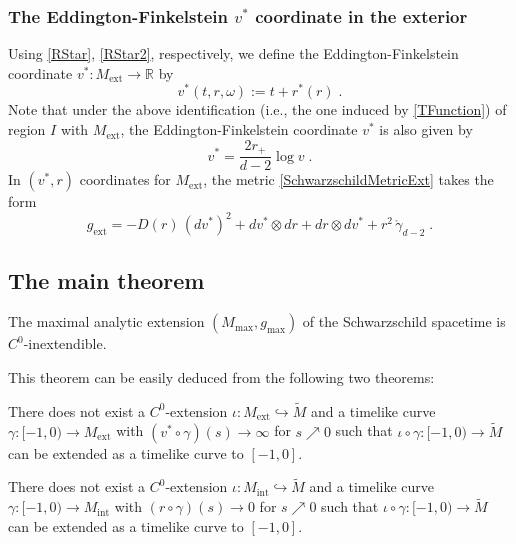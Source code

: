 \documentclass[reqno]{article}
\newcommand{\R}{\mathbb{R}}
\newcommand{\Mint}{M_{\mathrm{int}}}
\newcommand{\Mext}{M_{\mathrm{ext}}}
\newcommand{\gext}{g_{\mathrm{ext}}}
\newcommand{\Mmax}{M_{\mathrm{max}}}
\newcommand{\gmax}{g_{\mathrm{max}}}
\begin{document}
\subsubsection*{The Eddington-Finkelstein $v^*$ coordinate in the exterior}

Using \eqref{RStar}, \eqref{RStar2}, respectively, we define the Eddington-Finkelstein coordinate $v^* : \Mext \to \R$ by
\begin{equation*}
v^*(t,r, \omega) := t + r^*(r)\;.
\end{equation*}
Note that under the above identification (i.e., the one induced by \eqref{TFunction}) of region $I$ with $\Mext$, the Eddington-Finkelstein coordinate $v^*$ is also given by 
\begin{equation}
\label{VRel}
v^* = \frac{2r_+}{d-2} \log v\;. 
\end{equation}
In $(v^*, r)$ coordinates for $\Mext$, the metric \eqref{SchwarzschildMetricExt} takes the form
\begin{equation}
\label{MetricEd}
\gext = -D(r) \, (dv^*)^2 + dv^* \otimes dr + dr \otimes dv^* + r^2 \, \mathring{\gamma}_{d-2} \;.
\end{equation} 






\subsection{The main theorem}

\begin{theorem}
\label{MainThm}
The maximal analytic extension $(\Mmax, \gmax)$ of the Schwarzschild spacetime is $C^0$-inextendible.
\end{theorem}

This theorem can be easily deduced from the following two theorems:

\begin{theorem}
\label{Exterior}
There does not exist a $C^0$-extension $\iota : \Mext \hookrightarrow \tilde{M}$  and a timelike curve $\gamma : [-1, 0) \to \Mext$ with $(v^* \circ \gamma)(s) \to \infty$ for $s \nearrow 0$ such that $\iota \circ \gamma : [-1,0) \to \tilde{M}$ can be extended as a timelike curve to $[-1,0]$.
\end{theorem}

\begin{theorem}
\label{Inex}
There does not exist a $C^0$-extension $\iota : \Mint \hookrightarrow \tilde{M}$  and a timelike curve $\gamma : [-1, 0) \to \Mint$ with $(r \circ \gamma)(s) \to 0$ for $s \nearrow 0$ such that $\iota \circ \gamma : [-1,0) \to \tilde{M}$ can be extended as a timelike curve to $[-1,0]$.
\end{theorem}
\end{document}
